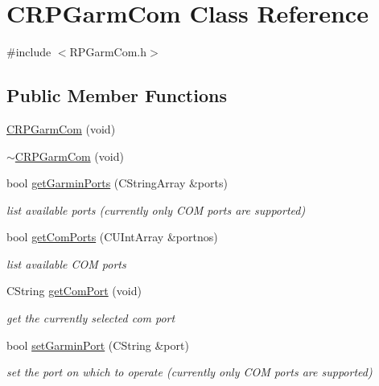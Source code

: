 \hypertarget{classCRPGarmCom}{
\section{CRPGarmCom Class Reference}
\label{classCRPGarmCom}
}


{\ttfamily \#include $<$RPGarmCom.h$>$}

\subsection*{Public Member Functions}
\begin{DoxyCompactItemize}
\item 
\hyperlink{classCRPGarmCom_af99792554c80cdf9aa51fdedcd08c1fd}{CRPGarmCom} (void)
\item 
\hyperlink{classCRPGarmCom_a9282cdc9cc8c35f68aeecb8b1948670c}{$\sim$CRPGarmCom} (void)
\item 
bool \hyperlink{classCRPGarmCom_a9323c9386fc90462b60e2973554a206b}{getGarminPorts} (CStringArray \&ports)
\begin{DoxyCompactList}\small\item\em list available ports (currently only COM ports are supported) \item\end{DoxyCompactList}\item 
bool \hyperlink{classCRPGarmCom_a23afa4d35dc6f61821a2494bebae3344}{getComPorts} (CUIntArray \&portnos)
\begin{DoxyCompactList}\small\item\em list available COM ports \item\end{DoxyCompactList}\item 
CString \hyperlink{classCRPGarmCom_a35fcc94c290c25389a352bf8c76501d8}{getComPort} (void)
\begin{DoxyCompactList}\small\item\em get the currently selected com port \item\end{DoxyCompactList}\item 
bool \hyperlink{classCRPGarmCom_a469e30de2b823fa581f883e7da68b444}{setGarminPort} (CString \&port)
\begin{DoxyCompactList}\small\item\em set the port on which to operate (currently only COM ports are supported) \item\end{DoxyCompactList}\item 

\end{DoxyCompactItemize}
